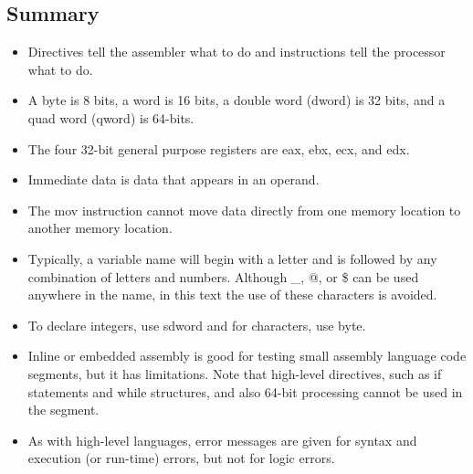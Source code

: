 \documentclass[10pt]{book}
\begin{document}
\subsection{Summary}
\begin{itemize}
  \item Directives tell the assembler what to do and instructions tell the processor what to do.
  \item A byte is 8 bits, a word is 16 bits, a double word (dword) is 32 bits, and a quad word (qword) is 64-bits.
  \item The four 32-bit general purpose registers are eax, ebx, ecx, and edx.
  \item Immediate data is data that appears in an operand.
  \item The mov instruction cannot move data directly from one memory location to another memory location.
  \item Typically, a variable name will begin with a letter and is followed by any combination of letters and numbers. Although \_, @, or \$ can be used anywhere in the name, in this text the use of these characters is avoided.
  \item To declare integers, use sdword and for characters, use byte.
  \item Inline or embedded assembly is good for testing small assembly language code segments, but it has limitations. Note that high-level directives, such as if statements and while structures, and also 64-bit processing cannot be used in the segment.
  \item As with high-level languages, error messages are given for syntax and execution (or run-time) errors, but not for logic errors.
\end{itemize}
\end{document}
